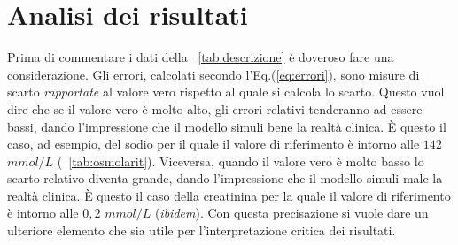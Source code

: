 \section{Analisi dei risultati}
Prima di commentare i dati della \tablename~\ref{tab:descrizione} è doveroso fare una considerazione. Gli errori, calcolati secondo l'Eq.(\ref{eq:errori}), sono misure di scarto \textit{rapportate} al valore vero rispetto al quale si calcola lo scarto. Questo vuol dire che se il valore vero è molto alto, gli errori relativi tenderanno ad essere bassi, dando l'impressione che il modello simuli bene la realtà clinica. È questo il caso, ad esempio, del sodio per il quale il valore di riferimento è intorno alle $142$ $mmol/L$ (\tablename~\ref{tab:osmolarit}). Viceversa, quando il valore vero è molto basso lo scarto relativo diventa grande, dando l'impressione che il modello simuli male la realtà clinica. È questo il caso della creatinina per la quale il valore di riferimento è intorno alle $0,2$ $mmol/L$ (\textit{ibidem}). Con questa precisazione si vuole dare un ulteriore elemento che sia utile per l'interpretazione critica dei risultati.

